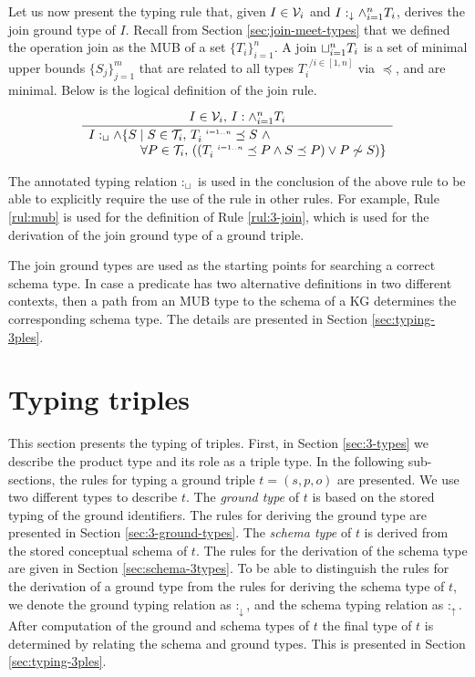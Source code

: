 \documentclass[runningheads]{llncs}
\newcommand{\s}{\scriptscriptstyle\ \,}
\newcommand{\darr}{\downarrow}
\newcommand{\uarr}{\uparrow}
\newcommand{\V}{{\cal V}}
\newcommand{\TT}{{\cal T}}
\begin{document}
  
Let us now present the typing rule that, given $I\in\V_i$ and
$I:_\darr\land_{i=1}^n\/T_i$, derives the join ground type of $I$. Recall
from Section \ref{sec:join-meet-types} that we defined the operation
join as the MUB of a set $\{T_i\}_{i=1}^n$. A join
$\sqcup_{i=1}^n\/T_i$ is a set of minimal upper bounds
$\{S_j\}_{j=1}^m$ that are related to all types $T_i^{\s/i\in[1,n]}$
via $\preceq$, and are minimal. Below is the logical definition of the
join rule.

\begin{equation}
\label{rul:mub}
\dfrac{I\in\V_i,\, \/I:\land_{i=1}^n\/T_i}
      {\begin{array}{l}
        I:_\sqcup\land\{S \mid \/S\in\TT_i,\,\/T_i^{\s\/i=1..n}\preceq\/S\ \land \\
        \phantom{I:\land\{S \mid\ }\forall\/P\in\TT_i,\,((T_i^{\s\/i=1..n}\preceq\/P\land\/S\preceq\/P)\lor\/P\not\sim\/S)\}
       \end{array}}
\end{equation}

The annotated typing relation $:_\sqcup$ is used in the conclusion of
the above rule to be able to explicitly require the use of the rule
in other rules. For example, Rule \ref{rul:mub} is used for the
definition of Rule \ref{rul:3-join}, which is used for the derivation
of the join ground type of a ground triple.

The join ground types are used as the starting points for searching a
correct schema type. In case a predicate has two alternative
definitions in two different contexts, then a path from an MUB type to
the schema of a KG determines the corresponding schema type. The
details are presented in Section \ref{sec:typing-3ples}.






\section{Typing triples\label{sec:triples}}


This section presents the typing of triples. First, in Section
\ref{sec:3-types} we describe the product type and its role as a
triple type. In the following sub-sections, the rules for typing a
ground triple $t=(s,p,o)$ are presented. We use two different types to
describe $t$. The \emph{ground type} of $t$ is based on the stored
typing of the ground identifiers. The rules for deriving the ground
type are presented in Section \ref{sec:3-ground-types}. The
\emph{schema type} of $t$ is derived from the stored conceptual schema
of $t$. The rules for the derivation of the schema type are given in
Section \ref{sec:schema-3types}. To be able to distinguish the rules
for the derivation of a ground type from the rules for deriving the
schema type of $t$, we denote the ground typing relation as $:_\darr$,
and the schema typing relation as $:_\uarr$. After computation of the
ground and schema types of $t$ the final type of $t$ is determined by
relating the schema and ground types. This is presented in Section
\ref{sec:typing-3ples}.
\end{document}
